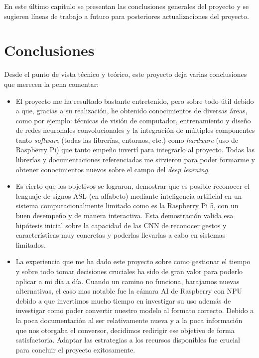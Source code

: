 
En este último capitulo se presentan las conclusiones generales del proyecto y se sugieren líneas de trabajo a futuro para posteriores actualizaciones del proyecto.

\section{Conclusiones}

Desde el punto de vista técnico y teórico, este proyecto deja varias conclusiones que merecen la pena comentar:

\begin{itemize}
    \item El proyecto me ha resultado bastante entretenido, pero sobre todo útil debido a que, gracias a su realización, he obtenido conocimientos de diversas áreas, como por ejemplo: técnicas de visión de computador, entrenamiento y diseño de redes neuronales convolucionales y la integración de múltiples componentes tanto \textit{software} (todas las librerías, entornos, etc.) como \textit{hardware} (uso de Raspberry Pi) que tanto empeño invertí para integrarlo al proyecto. Todas las librerías y documentaciones referenciadas me sirvieron para poder formarme y obtener conocimientos nuevos sobre el campo del \textit{deep learning}.

    \item Es cierto que los objetivos se lograron, demostrar que es posible reconocer el lenguaje de signos ASL (en alfabeto) mediante inteligencia artificial en un sistema computacionalmente limitado como es la Raspberry Pi 5, con un buen desempeño y de manera interactiva. Esta demostración valida esa hipótesis inicial sobre la capacidad de las CNN de reconocer gestos y características muy concretas y poderlas llevarlas a cabo en sistemas limitados. 

    \item La experiencia que me ha dado este proyecto sobre como gestionar el tiempo y sobre todo tomar decisiones cruciales ha sido de gran valor para poderlo aplicar a mi día a día. Cuando un camino no funciona, barajamos nuevas alternativas, el caso mas notable fue la cámara AI de Raspberry con NPU debido a que invertimos mucho tiempo en investigar su uso además de investigar como poder convertir nuestro modelo al formato correcto. Debido a la poca documentación al ser relativamente nueva y a la poca información que nos otorgaba el conversor, decidimos redirigir ese objetivo de forma satisfactoria. Adaptar las estrategias a los recursos disponibles fue crucial para concluir el proyecto exitosamente.

\end{itemize}






